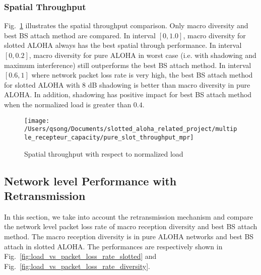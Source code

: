 \subsubsection{Spatial Throughput}
Fig.~\ref{fig:pureslotthroughputmpr} illustrates the spatial throughput comparison. Only macro diversity and best BS attach method are compared. In interval $\left[ 0, 1.0 \right]$, macro diversity for slotted ALOHA always has the best spatial through performance. In interval $\left[ 0, 0.2\right]$, macro diversity for pure ALOHA in worst case (i.e. with shadowing and maximum interference) still outperforms the best BS attach method.  In interval $\left[ 0.6, 1\right]$ where network packet loss rate is very high, the best BS attach method for slotted ALOHA with $8$ dB shadowing is better than macro diversity in pure ALOHA. In addition, shadowing has positive impact for best BS attach method when the normalized load is greater than $0.4$. 
%
%
\begin{figure}[!tb]
	\centering
	\texttt{[image: /Users/qsong/Documents/slotted\_aloha\_related\_project/multiple\_recepteur\_capacity/pure\_slot\_throughput\_mpr]}
	\caption{Spatial throughput with respect to normalized load}
	\label{fig:pureslotthroughputmpr}
\end{figure}

\subsection{Network level Performance with Retransmission}
In this section, we take into account the retransmission mechanism and compare the network level packet loss rate of macro reception diversity and best BS attach method. The macro reception diversity is in pure ALOHA networks and best BS attach in slotted ALOHA. The performances are respectively shown in Fig.~\ref{fig:load_vs_packet_loss_rate_slotted} and Fig.~\ref{fig:load_vs_packet_loss_rate_diversity}. 

